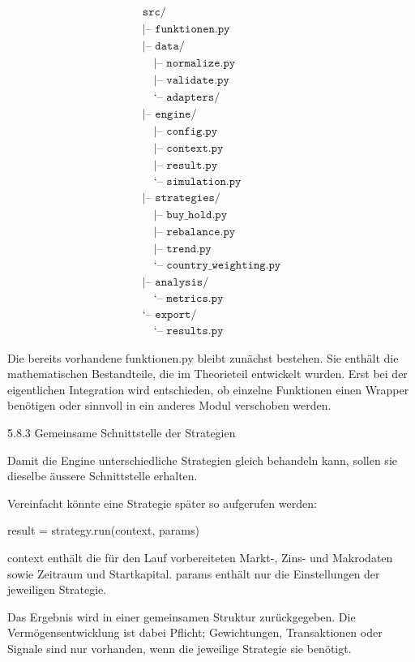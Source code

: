 \documentclass[
  ngerman,
  a4paper,
  DIV=11,
  oneside]{scrreprt}
\begin{document}
\[
\begin{array}{l}
\texttt{src/} \\
\texttt{|-- funktionen.py} \\
\texttt{|-- data/} \\
\quad \texttt{|-- normalize.py} \\
\quad \texttt{|-- validate.py} \\
\quad \texttt{`-- adapters/} \\
\texttt{|-- engine/} \\
\quad \texttt{|-- config.py} \\
\quad \texttt{|-- context.py} \\
\quad \texttt{|-- result.py} \\
\quad \texttt{`-- simulation.py} \\
\texttt{|-- strategies/} \\
\quad \texttt{|-- buy\_hold.py} \\
\quad \texttt{|-- rebalance.py} \\
\quad \texttt{|-- trend.py} \\
\quad \texttt{`-- country\_weighting.py} \\
\texttt{|-- analysis/} \\
\quad \texttt{`-- metrics.py} \\
\texttt{`-- export/} \\
\quad \texttt{`-- results.py}
\end{array}
\]

Die bereits vorhandene funktionen.py bleibt zunächst bestehen. Sie
enthält die mathematischen Bestandteile, die im Theorieteil entwickelt
wurden. Erst bei der eigentlichen Integration wird entschieden, ob
einzelne Funktionen einen Wrapper benötigen oder sinnvoll in ein anderes
Modul verschoben werden.

5.8.3 Gemeinsame Schnittstelle der Strategien

Damit die Engine unterschiedliche Strategien gleich behandeln kann,
sollen sie dieselbe äussere Schnittstelle erhalten.

Vereinfacht könnte eine Strategie später so aufgerufen werden:

result = strategy.run(context, params)

context enthält die für den Lauf vorbereiteten Markt-, Zins- und
Makrodaten sowie Zeitraum und Startkapital. params enthält nur die
Einstellungen der jeweiligen Strategie.

Das Ergebnis wird in einer gemeinsamen Struktur zurückgegeben. Die
Vermögensentwicklung ist dabei Pflicht; Gewichtungen, Transaktionen oder
Signale sind nur vorhanden, wenn die jeweilige Strategie sie benötigt.
\end{document}
